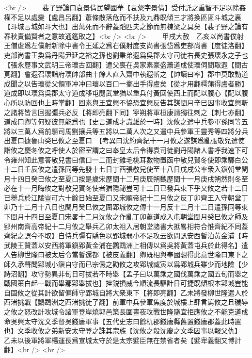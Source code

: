 <br />
　　裴子野論曰袁景倩民望國華【袁粲字景倩】受付託之重智不足以除姦權不足以處變【處昌呂翻】蕭條散落危而不扶及九鼎既傾三才將換區區斗城之裏【斗城言城如斗大也】出萬死而不辭蓋蹈匹夫之節而無棟梁之具矣【裴子野之論有春秋責備賢者之意故通鑑取之】<br />
<br />
　　甲戌大赦　乙亥以尚書僕射王僧䖍爲左僕射新除中書令王延之爲右僕射度支尚書張岱爲吏部尚書【度徒洛翻】吏部尚書王奐爲丹陽尹延之裕之孫也劉秉弟遐爲吳郡太守司徒右長史張瓌永之子也【張永歷事文武明三帝瓌古回翻】遭父喪在吳家素豪盛蕭道成使瓌伺間取遐【間古莧翻】會遐召瓌詣府瓌帥部曲十餘人直入齋中執遐斬之【帥讀曰率】郡中莫敢動道成聞之以告瓌從父領軍冲冲曰瓌以百口一擲出手得盧矣【從才用翻樗蒲得盧者勝】道成即以瓌爲吳郡太守道成移屯閱武堂猶以重兵付黃回使西上而配以腹心【配以腹心所以防回也上時掌翻】回素與王宜興不恊恐宜興反告其謀閏月辛巳因事收宜興斬之諸將皆言回握彊兵必反【將即亮翻下同】寜朔將軍桓康請獨往刺之【刺七亦翻】道成曰卿等何疑彼無能爲也【史言道成才識雄於一時】沈攸之遣中兵參軍孫同等五將以三萬人爲前驅司馬劉攘兵等五將以二萬人次之又遣中兵參軍王靈秀等四將分兵出夏口據魯山癸巳攸之至夏口　【考異曰沈約齊紀十一月攸之遂謀爲亂張敬兒遣使詣攸之慶冬攸之呼使人於密室謂之曰奉皇太后令得袁司徒劉丹陽諸人書呼我速下可令雍州知此意答敬兒書曰信口一二而封雞毛桃耳數物置函中敬兒賀冬使即乘驛白公十二日壬辰攸之遣孫同等先發十七日丁酉張敬兒使至十八日戊戌公率衆入鎭朝堂閏月十四日癸巳攸之至夏口按是歲宋歷閏十二月庚辰朔魏歷閏十一月庚戌朔然則冬至必在十一月晦攸之對敬兒賀冬使者猶隱祕豈可十二日已發兵東下乎又攸之若十二日已舉兵於江陵豈可六十餘日始至夏口又宋順帝紀十二月攸之反丁卯齊王入守朝堂丁卯乃十二月十八日也閏月癸巳攸之圍郢城攸之傳十一月反十二月十二日遣孫同等東下閏月十四日至夏口宋畧十二月沈攸之作亂丁卯蕭道成入屯朝堂閏月癸巳攸之師及郢州南齊高帝紀十二月攸之舉兵乙卯太祖入居朝堂諸書大抵畧相符合惟齊紀不同蓋齊紀之誤今不取】自恃兵彊有驕色以郢城弱小不足攻云欲問訊安西暫泊黃金浦【時武陵王贊蓋以安西將軍鎭郢黃金浦在鸚鵡洲上相傳以爲吳將黃蓋屯兵於此得名】遣人告柳世隆曰被太后令當暫還都【被皮義翻】卿既相與奉國想得此意世隆曰東下之師久承聲問郢城小鎭自守而已宗儼之勸攸之攻郢城臧寅以爲郢城兵雖少而地險【少詩沼翻】攻守勢異非旬日可拔若不時舉【孟子曰以萬乘之國伐萬乘之國五旬而舉之戰國策白起一戰而舉鄢郢舉拔也】挫鋭損威今順流長驅計日可捷既傾根本郢城豈能自固攸之從其計欲留偏師守郢城自將大衆東下【將即亮翻】乙未將發柳世隆遣人於西渚挑戰【鸚鵡洲之西渚挑徒了翻】前軍中兵參軍焦度於城樓上肆言罵攸之且穢辱之攸之怒改計攻城令諸軍登岸燒郭邑築長圍晝夜攻戰世隆隨宜拒應攸之不能克道成命吳興太守沈文季督吳錢唐軍事【五代史志曰餘杭郡錢唐縣舊置錢唐郡蓋此時置也】文季收攸之弟新安太守登之誅其宗族【沈攸之殺沈慶之文季因事以報父仇】　乙未以後軍將軍楊運長爲宣城太守於是太宗嬖臣無在禁省者矣【嬖卑義翻又博計翻】<br />
<br />
